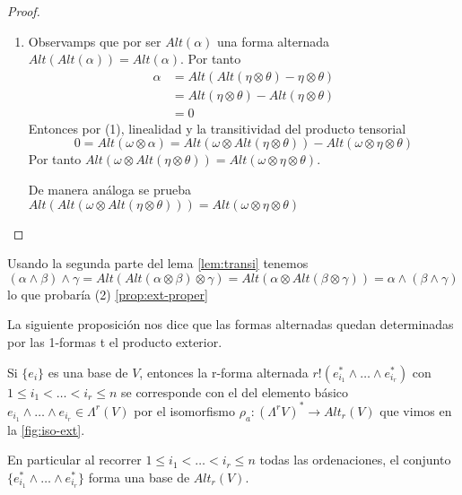\documentclass[../VD.tex]{subfiles}
\begin{document}
\begin{proof}
\begin{enumerate}
\begin{align*}
(\ref{proof:lem-transi} )&=Signo(\sigma_1)\sum_{\sigma\in G}Signo(\sigma)\alpha(w_{\sigma(1)}\ldots w_{\sigma(r)})\beta(w_{\sigma(r+1)}\ldots w_{\sigma(r+s)})\\
&=Signo(\sigma_1)(r!Alt(\alpha)(w_1\ldots w_r))\beta(w_{r+1}\ldots w_{r+s})\\
&=0
\end{align*}
Si tomamos \( \sigma_2\notin G\cup G\sigma_1 \), tenemos \( G\cap G\sigma_2=\emptyset \) y \( G\sigma_1\cap G\sigma_2=\emptyset \).\\
Repitiendo el proceso anterior llegamos a \( \sum_{\sigma_2}=0 \).

Por la finitud de \( G_{r+s} \) se llegará a cubrir \( G_{r+s} \) con conjuntos disjuntos de la forma \( G, G_{\sigma_1},\ldots,G_{\sigma_k} \) y cada uno de ellos no aporta nada a la suma total, que será por tanto nula.
\item Observamps que por ser \( Alt(\alpha) \) una forma alternada \( Alt(Alt(\alpha))=Alt(\alpha) \). Por tanto
\begin{align*}
\alpha&=Alt(Alt(\eta\otimes\theta)-\eta\otimes\theta)\\
&=Alt(\eta\otimes\theta)-Alt(\eta\otimes\theta)\\
&=0
\end{align*}
Entonces por (1), linealidad y la transitividad del producto tensorial
\[
0=Alt(\omega\otimes\alpha)=Alt(\omega\otimes Alt(\eta\otimes\theta))-Alt(\omega\otimes\eta\otimes\theta)
\]
Por tanto \( Alt(\omega\otimes Alt(\eta\otimes\theta))=Alt(\omega\otimes\eta\otimes\theta) \).

De manera análoga se prueba \( Alt(Alt(\omega\otimes Alt(\eta\otimes\theta)))=Alt(\omega\otimes\eta\otimes\theta) \)
\end{enumerate}
\end{proof}

\begin{note}
Usando la segunda parte del lema \ref{lem:transi} tenemos
\[
(\alpha\wedge\beta)\wedge\gamma=Alt(Alt(\alpha\otimes\beta)\otimes\gamma)=
Alt(\alpha\otimes Alt(\beta\otimes\gamma))=\alpha\wedge(\beta\wedge\gamma)
\]
lo que probaría (2) \ref{prop:ext-proper}
\end{note}

La siguiente proposición nos dice que las formas alternadas quedan determinadas por las 1-formas t el producto exterior.

\begin{proposition}\label{prop:base-alt}
Si \( \{e_i\} \) es una base de \( V \), entonces la r-forma alternada \(
r!(e_{i_1}^*\wedge\ldots\wedge e_{i_r}^*) \) con \( 1\leq i_1< \ldots<i_r\leq n
\) se corresponde con el del elemento básico \( e_{i_1}\wedge\ldots \wedge
e_{i_r}\in \Lambda^r(V) \)  por el isomorfismo \( \rho_a\colon(\Lambda^rV)^*\to
Alt_r(V)  \) que vimos en la \cref{fig:iso-ext}.

En particular al recorrer  \( 1\leq i_1< \ldots<i_r\leq n  \) todas las
ordenaciones, el conjunto \( \{e_{i_1}^*\wedge\ldots\wedge e_{i_r}^*\}\) forma
una base de \( Alt_r(V) \).
\end{proposition}
\end{document}
